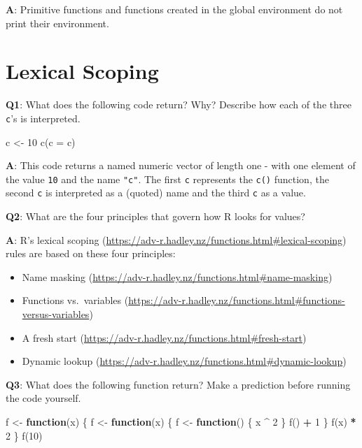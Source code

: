 \documentclass[
]{krantz}
\makeatletter
\newenvironment{Shaded}{\begin{snugshade}}{\end{snugshade}}
\newcommand{\ControlFlowTok}[1]{\textcolor[rgb]{0.13,0.29,0.53}{\textbf{#1}}}
\newcommand{\DataTypeTok}[1]{\textcolor[rgb]{0.13,0.29,0.53}{#1}}
\newcommand{\DecValTok}[1]{\textcolor[rgb]{0.00,0.00,0.81}{#1}}
\newcommand{\KeywordTok}[1]{\textcolor[rgb]{0.13,0.29,0.53}{\textbf{#1}}}
\newcommand{\NormalTok}[1]{#1}
\newcommand{\OperatorTok}[1]{\textcolor[rgb]{0.81,0.36,0.00}{\textbf{#1}}}
\newcommand{\StringTok}[1]{\textcolor[rgb]{0.31,0.60,0.02}{#1}}
\providecommand{\tightlist}{%
  \setlength{\itemsep}{0pt}\setlength{\parskip}{0pt}}
\renewcommand{\href}[2]{#2 (\url{#1})}
\newenvironment{kframe}{%
\medskip{}
\setlength{\fboxsep}{.8em}
 \def\at@end@of@kframe{}%
 \ifinner\ifhmode%
  \def\at@end@of@kframe{\end{minipage}}%
  \begin{minipage}{\columnwidth}%
 \fi\fi%
 \def\FrameCommand##1{\hskip\@totalleftmargin \hskip-\fboxsep
 \colorbox{shadecolor}{##1}\hskip-\fboxsep
     \hskip-\linewidth \hskip-\@totalleftmargin \hskip\columnwidth}%
 \MakeFramed {\advance\hsize-\width
   \@totalleftmargin\z@ \linewidth\hsize
   \@setminipage}}%
 {\par\unskip\endMakeFramed%
 \at@end@of@kframe}
\renewenvironment{Shaded}{\begin{kframe}}{\end{kframe}}
\renewcommand{\KeywordTok} [1]{\textcolor[rgb]{0.00,0.44,0.13}{{#1}}}
\renewcommand{\DataTypeTok}[1]{\textcolor[rgb]{0.56,0.13,0.00}{{#1}}}
\renewcommand{\DecValTok}  [1]{\textcolor[rgb]{0.25,0.63,0.44}{{#1}}}
\renewcommand{\StringTok}  [1]{\textcolor[rgb]{0.25,0.44,0.63}{{#1}}}
\renewcommand{\NormalTok}  [1]{{#1}}
\makeatother
\begin{document}
\textbf{{A}}: Primitive functions and functions created in the global environment do not print their environment.


\hypertarget{lexical-scoping}{%
\section{Lexical Scoping}\label{lexical-scoping}}

\textbf{{Q1}}: What does the following code return? Why? Describe how each of the three \texttt{c}'s is interpreted.

\begin{Shaded}
\begin{Highlighting}[]
\NormalTok{c <-}\StringTok{ }\DecValTok{10}
\KeywordTok{c}\NormalTok{(}\DataTypeTok{c =}\NormalTok{ c)}
\end{Highlighting}
\end{Shaded}

\textbf{{A}}: This code returns a named numeric vector of length one - with one element of the value \texttt{10} and the name \texttt{"c"}. The first \texttt{c} represents the \texttt{c()} function, the second \texttt{c} is interpreted as a (quoted) name and the third \texttt{c} as a value.

\textbf{{Q2}}: What are the four principles that govern how R looks for values?

\textbf{{A}}: R's \href{https://adv-r.hadley.nz/functions.html\#lexical-scoping}{lexical scoping} rules are based on these four principles:

\begin{itemize}
\tightlist
\item
  \href{https://adv-r.hadley.nz/functions.html\#name-masking}{Name masking}
\item
  \href{https://adv-r.hadley.nz/functions.html\#functions-versus-variables}{Functions vs.~variables}
\item
  \href{https://adv-r.hadley.nz/functions.html\#fresh-start}{A fresh start}
\item
  \href{https://adv-r.hadley.nz/functions.html\#dynamic-lookup}{Dynamic lookup}
\end{itemize}

\textbf{{Q3}}: What does the following function return? Make a prediction before running the code yourself.

\begin{Shaded}
\begin{Highlighting}[]
\NormalTok{f <-}\StringTok{ }\ControlFlowTok{function}\NormalTok{(x) \{}
\NormalTok{  f <-}\StringTok{ }\ControlFlowTok{function}\NormalTok{(x) \{}
\NormalTok{    f <-}\StringTok{ }\ControlFlowTok{function}\NormalTok{() \{}
\NormalTok{      x }\OperatorTok{^}\StringTok{ }\DecValTok{2}
\NormalTok{    \}}
    \KeywordTok{f}\NormalTok{() }\OperatorTok{+}\StringTok{ }\DecValTok{1}
\NormalTok{  \}}
  \KeywordTok{f}\NormalTok{(x) }\OperatorTok{*}\StringTok{ }\DecValTok{2}
\NormalTok{\}}
\KeywordTok{f}\NormalTok{(}\DecValTok{10}\NormalTok{)}
\end{Highlighting}
\end{Shaded}
\end{document}
